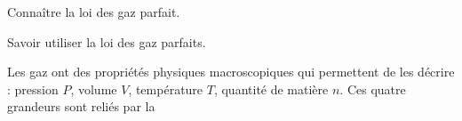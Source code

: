 \teteTermStssEnvi
{}
\vspace*{-8pt}

\begin{objectifs}
  \item Connaître la loi des gaz parfait.
  \item Savoir utiliser la loi des gaz parfaits.
\end{objectifs}

\begin{contexte}
  Les gaz ont des propriétés physiques macroscopiques qui permettent de les décrire : pression $P$, volume $V$, température $T$, quantité de matière $n$.
  Ces quatre grandeurs sont reliés par la 
  
\end{contexte}


